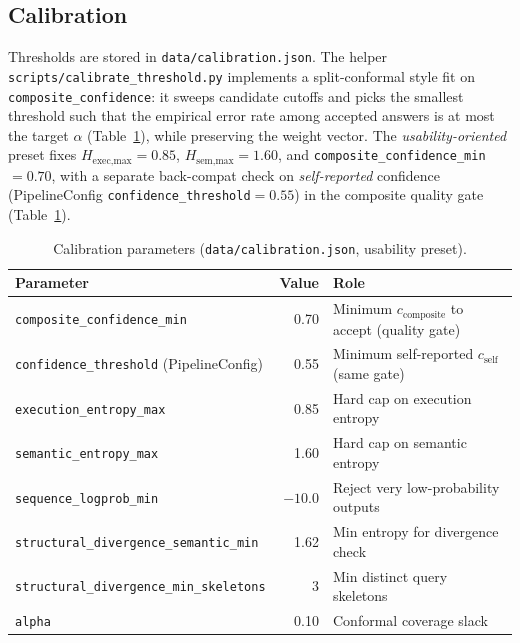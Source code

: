 \documentclass{article}
\begin{document}
\subsection{Calibration}

Thresholds are stored in \texttt{data/calibration.json}.  The helper
\texttt{scripts/calibrate\_threshold.py} implements a split-conformal style
fit on \texttt{composite\_confidence}: it sweeps candidate cutoffs and picks
the smallest threshold such that the empirical error rate among accepted
answers is at most the target $\alpha$ (Table~\ref{tab:calibration}), while
preserving the weight vector.
The \emph{usability-oriented} preset fixes
$H_{\text{exec,max}}{=}0.85$, $H_{\text{sem,max}}{=}1.60$, and
\texttt{composite\_confidence\_min}${=}0.70$, with a separate back-compat
check on \emph{self-reported} confidence (PipelineConfig
\texttt{confidence\_threshold}${=}0.55$) in the composite quality gate
(Table~\ref{tab:calibration}).

\begin{table}[h]
\centering
\caption{Calibration parameters (\texttt{data/calibration.json}, usability preset).}
\label{tab:calibration}
\small
\begin{tabular}{lrl}
\toprule
\textbf{Parameter} & \textbf{Value} & \textbf{Role} \\
\midrule
\texttt{composite\_confidence\_min}            & 0.70    & Minimum $c_{\text{composite}}$ to accept (quality gate) \\
\texttt{confidence\_threshold} (PipelineConfig) & 0.55 & Minimum self-reported $c_{\text{self}}$ (same gate) \\
\texttt{execution\_entropy\_max}                & 0.85    & Hard cap on execution entropy \\
\texttt{semantic\_entropy\_max}                 & 1.60    & Hard cap on semantic entropy \\
\texttt{sequence\_logprob\_min}                 & $-10.0$ & Reject very low-probability outputs \\
\texttt{structural\_divergence\_semantic\_min}  & 1.62    & Min entropy for divergence check \\
\texttt{structural\_divergence\_min\_skeletons} & 3       & Min distinct query skeletons \\
\texttt{alpha}                                  & 0.10    & Conformal coverage slack \\
\bottomrule
\end{tabular}
\end{table}
\end{document}

